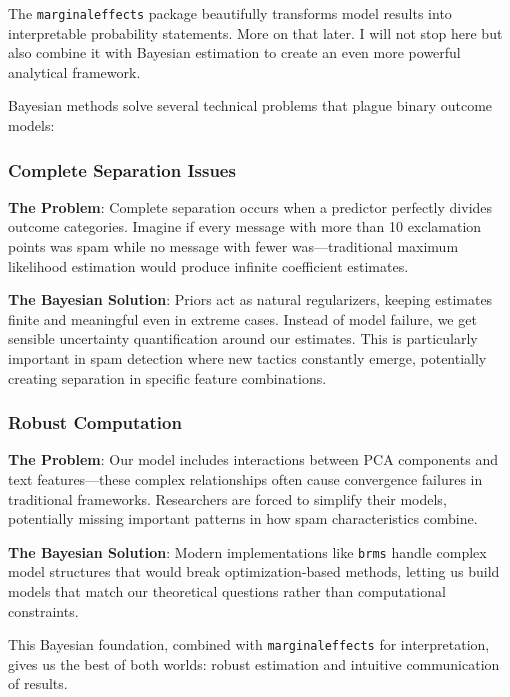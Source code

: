 \documentclass[
  letterpaper,
  DIV=11,
  numbers=noendperiod]{scrartcl}
\begin{document}
\begin{tcolorbox}[enhanced jigsaw, coltitle=black, colframe=quarto-callout-note-color-frame, breakable, leftrule=.75mm, colbacktitle=quarto-callout-note-color!10!white, bottomtitle=1mm, toprule=.15mm, titlerule=0mm, rightrule=.15mm, title=\textcolor{quarto-callout-note-color}{\faInfo}\hspace{0.5em}{But Wait! Why Bayesian?}, arc=.35mm, opacitybacktitle=0.6, colback=white, left=2mm, toptitle=1mm, opacityback=0, bottomrule=.15mm]

The \texttt{marginaleffects} package beautifully transforms model
results into interpretable probability statements. More on that later. I
will not stop here but also combine it with Bayesian estimation to
create an even more powerful analytical framework.

Bayesian methods solve several technical problems that plague binary
outcome models:

\subsubsection{Complete Separation
Issues}\label{complete-separation-issues}

\textbf{The Problem}: Complete separation occurs when a predictor
perfectly divides outcome categories. Imagine if every message with more
than 10 exclamation points was spam while no message with fewer
was---traditional maximum likelihood estimation would produce infinite
coefficient estimates.

\textbf{The Bayesian Solution}: Priors act as natural regularizers,
keeping estimates finite and meaningful even in extreme cases. Instead
of model failure, we get sensible uncertainty quantification around our
estimates. This is particularly important in spam detection where new
tactics constantly emerge, potentially creating separation in specific
feature combinations.

\subsubsection{Robust Computation}\label{robust-computation}

\textbf{The Problem}: Our model includes interactions between PCA
components and text features---these complex relationships often cause
convergence failures in traditional frameworks. Researchers are forced
to simplify their models, potentially missing important patterns in how
spam characteristics combine.

\textbf{The Bayesian Solution}: Modern implementations like
\texttt{brms} handle complex model structures that would break
optimization-based methods, letting us build models that match our
theoretical questions rather than computational constraints.

This Bayesian foundation, combined with \texttt{marginaleffects} for
interpretation, gives us the best of both worlds: robust estimation and
intuitive communication of results.

\end{tcolorbox}
\end{document}
